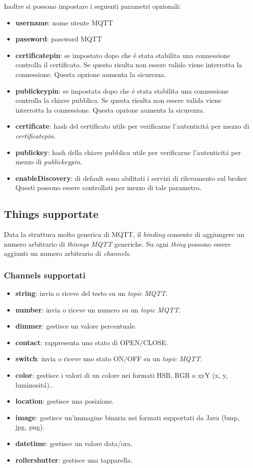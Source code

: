 Inoltre si possono impostare i seguenti parametri opzionali:
\begin{itemize}
    \item \textbf{username}: nome utente MQTT
    \item \textbf{password}: password MQTT
    \item \textbf{certificatepin}: se impostato dopo che \'e stata stabilita una connessione controlla il certificato. Se questo risulta non essere valido viene interrotta la connessione. Questa opzione aumenta la sicurezza.
    \item \textbf{publickeypin}: se impostata dopo che \'e stata stabilita una connessione controlla la chiave pubblica. Se questa risulta non essere valida viene interrotta la connessione. Questa opzione aumenta la sicurezza.
    \item \textbf{certificate}: hash del certificato utile per verificarne l'autenticit\'a per mezzo di {\em certificatepin}.
    \item \textbf{publickey}: hash della chiave pubblica utile per verificarne l'autenticit\'a per mezzo di {\em publickeypin}.
    \item \textbf{enableDiscovery}: di default sono abilitati i servizi di rilevamento sul broker. Questi possono essere controllati per mezzo di tale parametro.
\end{itemize}

\subsection{Things supportate}
Data la struttura molto generica di MQTT, il {\em binding}  consente di aggiungere un numero arbitrario di {\em thinngs MQTT} generiche. Su ogni {\em thing} possono essere aggiunti un numero arbitrario di {\em channels}.

\subsubsection{Channels supportati}
\begin{itemize}
    \item \textbf{string}: invia o riceve del testo su un {\em topic MQTT}.
    \item \textbf{number}: invia o riceve un numero su un {\em topic MQTT}.
    \item \textbf{dimmer}: gestisce un valore percentuale.
    \item \textbf{contact}: rappresenta uno stato di OPEN/CLOSE.
    \item \textbf{switch}: invia o riceve uno stato ON/OFF su un {\em topic MQTT}.
    \item \textbf{color}: gestisce i valori di un colore nei formati HSB, RGB o xyY (x, y, luminosit\'a)..
    \item \textbf{location}: gestisce una posizione.
    \item \textbf{image}: gestisce un'immagine binaria nei formati supportati da Java (bmp, jpg, png).
    \item \textbf{datetime}: gestisce un valore data/ora.
    \item \textbf{rollershutter}: gestisce una tapparella.
\end{itemize}

